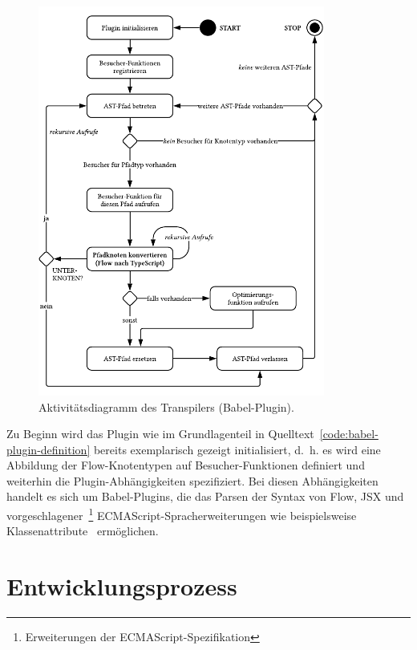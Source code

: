 \begin{figure}[p]
  \centering
  \includegraphics[width=0.84\textwidth]{src/4_Umsetzung/img/activity-diagram-transpiler.pdf}
  \captionsetup{justification=centering}
  \caption{Aktivitätsdiagramm des Transpilers (Babel-Plugin).}
  \label{fig:activity-diagram-transpiler}
\end{figure}

Zu Beginn wird das Plugin wie im Grundlagenteil in Quelltext~\ref{code:babel-plugin-definition} bereits exemplarisch gezeigt initialisiert, d.~h. es wird eine Abbildung der Flow-Knotentypen auf Besucher-Funktionen definiert und weiterhin die Plugin-Abhängigkeiten spezifiziert. Bei diesen Abhängigkeiten handelt es sich um Babel-Plugins, die das Parsen der Syntax von Flow, JSX und vorgeschlagener~\footnote{Erweiterungen der ECMAScript-Spezifikation } ECMAScript-Spracherweiterungen wie beispielsweise Klassenattribute~\autocite{} ermöglichen.

\section{Entwicklungsprozess}

